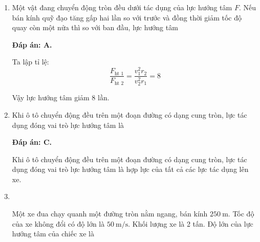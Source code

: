 \begin{enumerate}[label=\bfseries Câu \arabic*:]
	\item {}
	
	
	{
		Một vật đang chuyển động tròn đều dưới tác dụng của lực hướng tâm $F$. Nếu bán kính quỹ đạo tăng gấp hai lần so với trước và đồng thời giảm tốc độ quay còn một nửa thì so với ban đầu, lực hướng tâm
	}
	
	\hideall
	{	
		\textbf{Đáp án: A.}
		
		Ta lập tỉ lệ:
		$$\dfrac{F_\text{ht 1}}{F_\text{ht 2}} = \dfrac{v_1 ^2 r_2}{v_2 ^2 r_1} = 8$$
		
		Vậy lực hướng tâm giảm 8 lần.
	}
	\item {}
	
	
	{
		Khi ô tô chuyển động đều trên một đoạn đường có dạng cung tròn, lực tác dụng đóng vai trò lực hướng tâm là
	}
	
	\hideall
	{	
		\textbf{Đáp án: C.}
		
		Khi ô tô chuyển động đều trên một đoạn đường có dạng cung tròn, lực tác dụng đóng vai trò lực hướng tâm là hợp lực của tất cả các lực tác dụng lên xe.
	}


\item{}\\
{Một xe đua chạy quanh một đường tròn nằm ngang, bán kính $\SI{250}{\meter}$. Tốc độ của xe không đổi có độ lớn là $\SI{50}{\meter/\second}$. Khối lượng xe là 2 tấn. Độ lớn của lực hướng tâm của chiếc xe là
}


\end{enumerate}
